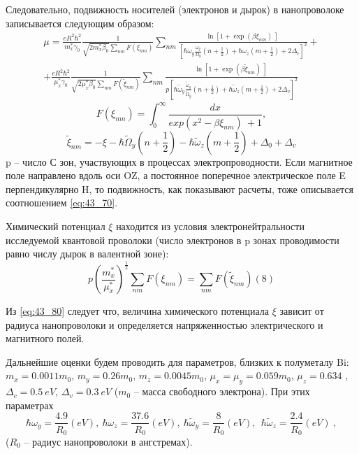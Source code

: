 Следовательно, подвижность носителей (электронов и дырок) в нанопроволоке записывается следующим образом:
\begin{multline} \label{eq:43_70} 
\mu =\frac{eR^2{\hbar }^2}{m^*_x{\gamma }_0}\frac{1}{\sqrt{2m^*_x{\beta }_0}\sum_{nm}{F\left({\xi }_{nm}\right)}}\sum_{nm}{\frac{{\ln \left[1+{\exp \left(\beta {\xi }_{nm}\right)\ }\right]\ }}{{\left[\hbar {\omega }_y\frac{{\omega }_y}{{\Omega }_y}\left(n+\frac{1}{2}\right)+\hbar {\omega }_z\left(m+\frac{1}{2}\right)+2{\Delta }_c\right]}^2}}+\\
+\frac{eR^2{\hbar }^2}{{\mu }^*_x{\gamma }_0}\frac{1}{\sqrt{2{\mu }^*_x{\beta }_0}\sum_{nm}{F\left({\widetilde{\xi }}_{nm}\right)}}\sum_{nm}{\frac{{\ln \left[1+{\exp \left(\beta {\widetilde{\xi }}_{nm}\right)\ }\right]\ }}{p{\left[\hbar {\widetilde{\omega }}_y\frac{{\widetilde{\omega }}_y}{{\widetilde{\Omega }}_y}\left(n+\frac{1}{2}\right)+\hbar {\widetilde{\omega }}_z\left(m+\frac{1}{2}\right)+2{\Delta }_v\right]}^2}} 
\end{multline}
\[
F\left({\xi }_{nm}\right)=\int^{\infty }_0{\frac{dx}{{exp \left(x^2-\beta {\xi }_{nm}\right)\ }+1}},
\]
\[
{\widetilde{\xi }}_{nm}=-\xi -\hbar {\widetilde{\Omega }}_y\left(n+\frac{1}{2}\right)-\hbar {\widetilde{\omega }}_z\left(m+\frac{1}{2}\right)+{\Delta }_0+{\Delta }_v
\]
p -- число С зон, участвующих в процессах электропроводности. Если магнитное поле направлено вдоль оси OZ, а постоянное поперечное электрическое поле E перпендикулярно H, то подвижность, как показывают расчеты, тоже описывается соотношением \eqref{eq:43_70}.

Химический потенциал $\xi $ находится из условия электронейтральности исследуемой квантовой проволоки (число электронов в p зонах проводимости равно числу дырок в валентной зоне):
\begin{equation} \label{eq:43_80} 
p{\left(\frac{m^*_x}{{\mu }^*_x}\right)}^{\frac{1}{2}}\sum_{nm}{F\left({\xi }_{nm}\right)}=\sum_{nm}{F\left({\widetilde{\xi }}_{nm}\right)} (8) 
\end{equation}

Из \eqref{eq:43_80} следует что, величина химического потенциала $\xi $ зависит от радиуса нанопроволоки и определяется напряженностью электрического и магнитного полей.

Дальнейшие оценки будем проводить для параметров, близких к полуметалу Bi: $m_x=0.0011m_0$, $m_y=0.26m_0$, $m_z=0.0045m_0$, ${\mu }_x={\mu }_y=0.059m_0$, ${\mu }_z=0.634$ \cite{Levin2009a}, ${\Delta }_c=0.5\ eV$, ${\Delta }_v=0.3\ eV$ ($m_0$ -- масса свободного электрона). При этих параметрах
\[
\hbar {\omega }_y=\frac{4.9}{R_0}\left(eV\right),\ \hbar {\omega }_z=\frac{37.6}{R_0}\left(eV\right),\ \hbar {\widetilde{\omega }}_y=\frac{8}{R_0}\left(eV\right),\ \ \hbar {\widetilde{\omega }}_z=\frac{2.4}{R_0}\left(eV\right)\ ,
\] 
($R_0$ -- радиус нанопроволоки в ангстремах).

